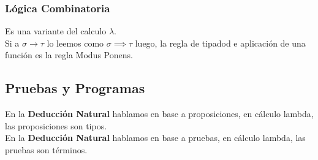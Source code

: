 \documentclass[10pt,a4paper]{article}
\begin{document}
\subsubsection{Lógica Combinatoria}
Es una variante del calculo $\lambda$. \\
Si a $\sigma \rightarrow \tau$ lo leemos como $\sigma \implies \tau$ luego, la regla de tipadod e aplicación de una función es la regla Modus Ponens. \\
\subsection*{Pruebas y Programas}
En la \textbf{Deducción Natural} hablamos en base a proposiciones, en cálculo lambda, las proposiciones son tipos. \\
En la \textbf{Deducción Natural} hablamos en base a pruebas, en cálculo lambda, las pruebas son términos. 
\end{document}
